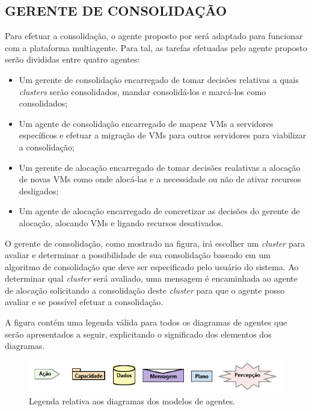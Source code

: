 \subsection{GERENTE DE CONSOLIDAÇÃO}

Para efetuar a consolidação, o agente proposto por  será adaptado para funcionar com a plataforma multiagente. Para tal, as tarefas efetuadas pelo agente proposto serão divididas entre quatro agentes:
\begin{itemize}
  \item Um gerente de consolidação encarregado de tomar decisões relativas a quais \emph{clusters} serão consolidados, mandar consolidá-los e marcá-los como consolidados;
	\item Um agente de consolidação encarregado de mapear VMs a servidores específicos e efetuar a migração de VMs para outros servidores para viabilizar a consolidação;
	\item Um gerente de alocação encarregado de tomar decisões realativas a alocação de novas VMs como onde alocá-las e a necessidade ou não de ativar recursos desligados;
	\item Um agente de alocação encarregado de concretizar as decisões do gerente de alocação, alocando VMs e ligando recursos desativados.
\end{itemize}

O gerente de consolidação, como mostrado na figura, irá escolher um \emph{cluster} para avaliar e determinar a possibilidade de sua consolidação baseado em um algoritmo de consolidação que deve ser especificado pelo usuário do sistema. Ao determinar qual \emph{cluster} será avaliado, uma mensagem é encaminhada ao agente de alocação solicitando a consolidação deste \emph{cluster} para que o agente posso avaliar e se possível efetuar a consolidação.

A figura contém uma legenda válida para todos os diagramas de agentes que serão apresentados a seguir, explicitando o significado dos elementos dos diagramas.

\begin{figure}[!htb]
	\centering
	\caption{Legenda relativa aos diagramas dos modelos de agentes.}\label{fig:legenda-agentes}
	\includegraphics[width=1\textwidth]{figuras/legenda-agentes.png}
\end{figure}

